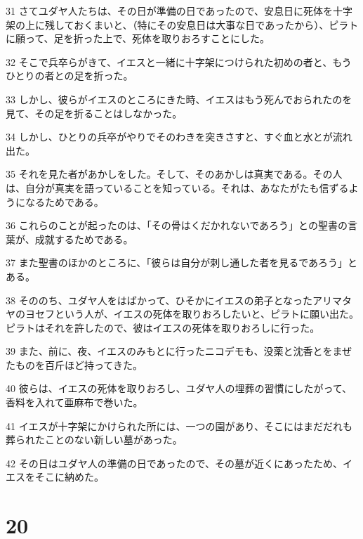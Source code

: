 \par 31 さてユダヤ人たちは、その日が準備の日であったので、安息日に死体を十字架の上に残しておくまいと、（特にその安息日は大事な日であったから）、ピラトに願って、足を折った上で、死体を取りおろすことにした。
\par 32 そこで兵卒らがきて、イエスと一緒に十字架につけられた初めの者と、もうひとりの者との足を折った。
\par 33 しかし、彼らがイエスのところにきた時、イエスはもう死んでおられたのを見て、その足を折ることはしなかった。
\par 34 しかし、ひとりの兵卒がやりでそのわきを突きさすと、すぐ血と水とが流れ出た。
\par 35 それを見た者があかしをした。そして、そのあかしは真実である。その人は、自分が真実を語っていることを知っている。それは、あなたがたも信ずるようになるためである。
\par 36 これらのことが起ったのは、「その骨はくだかれないであろう」との聖書の言葉が、成就するためである。
\par 37 また聖書のほかのところに、「彼らは自分が刺し通した者を見るであろう」とある。
\par 38 そののち、ユダヤ人をはばかって、ひそかにイエスの弟子となったアリマタヤのヨセフという人が、イエスの死体を取りおろしたいと、ピラトに願い出た。ピラトはそれを許したので、彼はイエスの死体を取りおろしに行った。
\par 39 また、前に、夜、イエスのみもとに行ったニコデモも、没薬と沈香とをまぜたものを百斤ほど持ってきた。
\par 40 彼らは、イエスの死体を取りおろし、ユダヤ人の埋葬の習慣にしたがって、香料を入れて亜麻布で巻いた。
\par 41 イエスが十字架にかけられた所には、一つの園があり、そこにはまだだれも葬られたことのない新しい墓があった。
\par 42 その日はユダヤ人の準備の日であったので、その墓が近くにあったため、イエスをそこに納めた。

\chapter{20}

